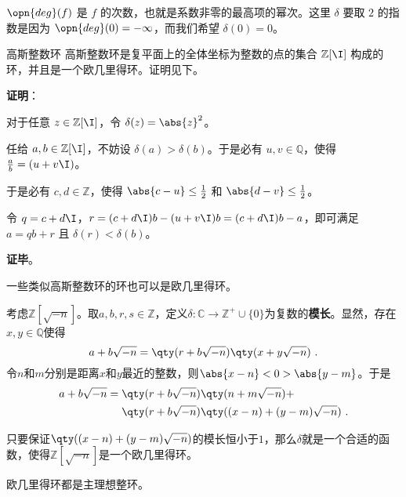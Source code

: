 $\opn{deg}(f)$ 是 $f$ 的次数，也就是系数非零的最高项的幂次。这里 $\delta$ 要取 $2$ 的指数是因为 $\opn{deg}(0)=-\infty$，而我们希望 $\delta(0)=0$。

\begin{example}{高斯整数环}
高斯整数环是复平面上的全体坐标为整数的点的集合 $\mathbb{Z}[\I]$ 构成的环，并且是一个欧几里得环。证明见下。
\end{example}

\textbf{证明}：

对于任意 $z\in\mathbb{Z}[\I]$，令 $\delta(z)=\abs{z}^2$。

任给 $a, b\in\mathbb{Z}[\I]$，不妨设 $\delta(a)>\delta(b)$。于是必有 $u, v\in\mathbb{Q}$，使得 $\frac{a}{b}=(u+v\I)$。

于是必有 $c, d\in\mathbb{Z}$，使得 $\abs{c-u}\leq\frac{1}{2}$ 和 $\abs{d-v}\leq\frac{1}{2}$。

令 $q=c+d\I$，$r=(c+d\I)b-(u+v\I)b=(c+d\I)b-a$，即可满足 $a=qb+r$ 且 $\delta(r)<\delta(b)$。

\textbf{证毕}。


一些类似高斯整数环的环也可以是欧几里得环。



\begin{example}{}\label{ex_EuRing_1}

考虑$\mathbb{Z}[\sqrt{-n}]$。取$a, b, r, s\in\mathbb{Z}$，定义$\delta:\mathbb{C}\to \mathbb{Z}^+\cup\{0\}$为复数的\textbf{模长}。显然，存在$x, y\in \mathbb{Q}$使得
\begin{equation}
a+b\sqrt{-n} = \qty(r+b\sqrt{-n})\qty(x+y\sqrt{-n})~. 
\end{equation}
令$n$和$m$分别是距离$x$和$y$最近的整数，则$\abs{x-n}<0>\abs{y-m}$。于是
\begin{equation}
\begin{aligned}
a+b\sqrt{-n} ={}& \qty(r+b\sqrt{-n})\qty(n+m\sqrt{-n})+\\
&\qty(r+b\sqrt{-n})\qty((x-n)+(y-m)\sqrt{-n})~. 
\end{aligned}
\end{equation}

只要保证$\qty((x-n)+(y-m)\sqrt{-n})$的模长恒小于$1$，那么$\delta$就是一个合适的函数，使得$\mathbb{Z}[\sqrt{-n}]$是一个欧几里得环。

\end{example}









\begin{theorem}{}
欧几里得环都是主理想整环。
\end{theorem}

